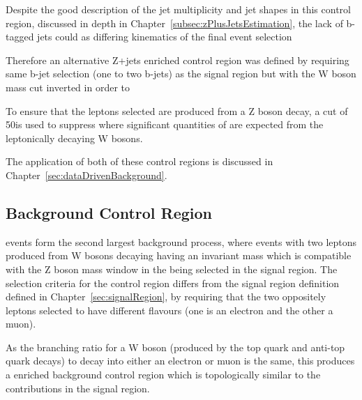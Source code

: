 Despite the good description of the jet multiplicity and jet \pT shapes in this control region, discussed in depth in Chapter~\ref{subsec:zPlusJetsEstimation}, the lack of b-tagged jets could 
as differing kinematics of the final event selection 

Therefore an alternative Z+jets enriched control region was defined by requiring same b-jet selection (one to two b-jets) as the signal region but with the W boson mass cut inverted in order to 

To ensure that the leptons selected are produced from a Z boson decay, a \MET cut of 50\GeV is used to suppress \ttbar where significant quantities of \MET are expected from the leptonically decaying W bosons.

The application of both of these control regions is discussed in Chapter~\ref{sec:dataDrivenBackground}.

\subsection{\ttbar Background Control Region}\label{subsec:ttbarCR}
\ttbar events form the second largest background process, where events with two leptons produced from W bosons decaying having an invariant mass which is compatible with the Z boson mass window in the being selected in the signal region.
The selection criteria for the \ttbar control region differs from the signal region definition defined in Chapter~\ref{sec:signalRegion}, by requiring that the two oppositely leptons selected to have different flavours (\ie one is an electron and the other a muon).

As the branching ratio for a W boson (produced by the top quark and anti-top quark decays) to decay into either an electron or muon is the same, this produces a \ttbar enriched background control region which is topologically similar to the \ttbar contributions in the signal region. 

